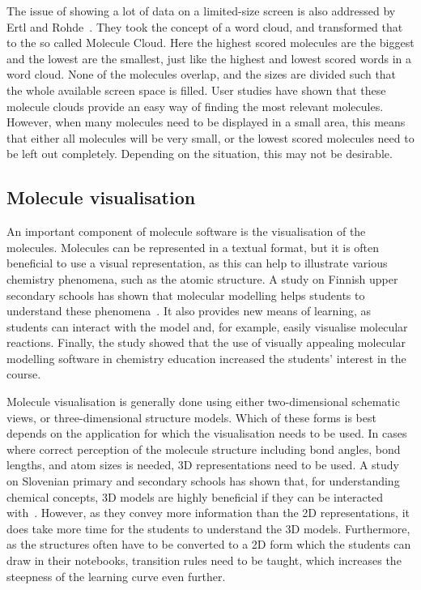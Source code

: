 The issue of showing a lot of data on a limited-size screen is also addressed by Ertl and Rohde~\cite{ertl2012molecule}. They took the concept of a word cloud, and transformed that to the so called Molecule Cloud. Here the highest scored molecules are the biggest and the lowest are the smallest, just like the highest and lowest scored words in a word cloud. None of the molecules overlap, and the sizes are divided such that the whole available screen space is filled. User studies have shown that these molecule clouds provide an easy way of finding the most relevant molecules. However, when many molecules need to be displayed in a small area, this means that either all molecules will be very small, or the lowest scored molecules need to be left out completely. Depending on the situation, this may not be desirable.

\subsection{Molecule visualisation}
An important component of molecule software is the visualisation of the molecules. Molecules can be represented in a textual format, but it is often beneficial to use a visual representation, as this can help to illustrate various chemistry phenomena, such as the atomic structure. A study on Finnish upper secondary schools has shown that molecular modelling helps students to understand these phenomena~\cite{aksela2008computer}. It also provides new means of learning, as students can interact with the model and, for example, easily visualise molecular reactions. Finally, the study showed that the use of visually appealing molecular modelling software in chemistry education increased the students' interest in the course.

Molecule visualisation is generally done using either two-dimensional schematic views, or three-dimensional structure models. Which of these forms is best depends on the application for which the visualisation needs to be used. In cases where correct perception of the molecule structure including bond angles, bond lengths, and atom sizes is needed, 3D representations need to be used. A study on Slovenian primary and secondary schools has shown that, for understanding chemical concepts, 3D models are highly beneficial if they can be interacted with~\cite{ferk2003students}. However, as they convey more information than the 2D representations, it does take more time for the students to understand the 3D models. Furthermore, as the structures often have to be converted to a 2D form which the students can draw in their notebooks, transition rules need to be taught, which increases the steepness of the learning curve even further.

